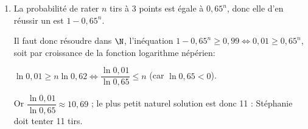 \begin{enumerate}
	\begin{enumerate}
		\item %
Les tirs sont indépendants et à chaque tir la probabilité de le réussir est égale à 0,35 : la variable aléatoire $X$ égale au nombre de réussites suit donc une loi binomiale de paramètres $n = 10$ et $p  = 0,35$.
		\item %
		On a $E = np = 10 \times 0,35 = 3,5$ : en moyenne sur $20$ tirs Stéphanie en réussira $7$.
		\item %
		La calculatrice donne $p(X \leqslant 6) \approx 0,97$.
		\item %
		On a de même $p(X \geqslant 6) \approx 0,095$.
	\end{enumerate}
\item %



La probabilité de rater $n$ tirs à 3 points est égale à $0,65^n$, donc elle d'en réussir un est $1 - 0,65^n$.

Il faut donc résoudre dans $\N$, l'inéquation $1 - 0,65^n \geqslant 0,99 \iff 0,01 \geqslant 0,65^n$, soit par croissance de la fonction logarithme népérien:

$\ln 0,01 \geqslant n\ln 0,62 \iff \dfrac{\ln 0,01}{\ln 0,65} \leqslant n$ (car $\ln 0,65 < 0$).

Or $\dfrac{\ln 0,01}{\ln 0,65} \approx 10,69$ ; le plus petit naturel solution est donc 11 : Stéphanie doit tenter 11 tirs.
\end{enumerate}

\bigskip

